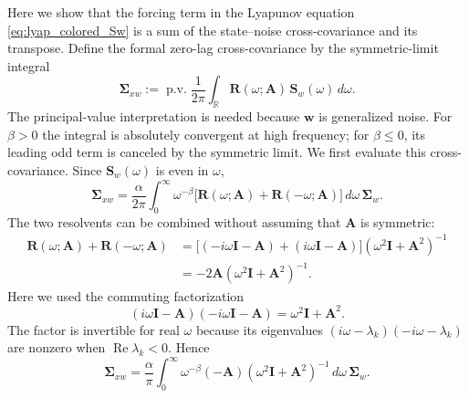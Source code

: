 \documentclass[12pt]{article}
\begin{document}
Here we show that the forcing term in the Lyapunov equation \eqref{eq:lyap_colored_Sw} is a sum of the state--noise cross-covariance and its transpose. Define the formal zero-lag cross-covariance by the symmetric-limit integral
\begin{equation}
    \boldsymbol{\Sigma}_{xw}
    :=\operatorname{p.v.}\frac{1}{2\pi}\int_{\mathbb R}
    \mathbf R(\omega;\mathbf A)\,\mathbf S_w(\omega)\,d\omega .
    \label{eq:Sigma_xw_definition}
\end{equation}
The principal-value interpretation is needed because $\boldsymbol w$ is generalized noise. For $\beta>0$ the integral is absolutely convergent at high frequency; for $\beta\le0$, its leading odd term is canceled by the symmetric limit. We first evaluate this cross-covariance. Since $\mathbf S_w(\omega)$ is even in $\omega$,
\begin{equation}
\boldsymbol{\Sigma}_{xw}
=\frac{\alpha}{2\pi}\int_{0}^{\infty}\omega^{-\beta}
\bigl[\mathbf R(\omega;\mathbf A)+\mathbf R(-\omega;\mathbf A)\bigr]\,d\omega\,
\boldsymbol{\Sigma}_w .
\label{eq:Sigma_xw_even}
\end{equation}
The two resolvents can be combined without assuming that $\mathbf A$ is symmetric:
\begin{equation}
\begin{aligned}
\mathbf R(\omega;\mathbf A)+\mathbf R(-\omega;\mathbf A)
&=\bigl[(-i\omega\mathbf I-\mathbf A)+(i\omega\mathbf I-\mathbf A)\bigr]
  (\omega^2\mathbf I+\mathbf A^2)^{-1}\\
&=-2\mathbf A(\omega^2\mathbf I+\mathbf A^2)^{-1}.
\end{aligned}
\label{eq:resolvent_pair_sum}
\end{equation}
Here we used the commuting factorization
\begin{equation}
(i\omega\mathbf I-\mathbf A)(-i\omega\mathbf I-\mathbf A)
=\omega^2\mathbf I+\mathbf A^2 .
\label{eq:resolvent_product}
\end{equation}
The factor is invertible for real $\omega$ because its eigenvalues
$(i\omega-\lambda_k)(-i\omega-\lambda_k)$ are nonzero when
$\operatorname{Re}\lambda_k<0$. Hence
\begin{equation}
\boldsymbol{\Sigma}_{xw}
=\frac{\alpha}{\pi}\int_{0}^{\infty}\omega^{-\beta}
(-\mathbf A)(\omega^2\mathbf I+\mathbf A^2)^{-1}\,d\omega\,
\boldsymbol{\Sigma}_w .
\label{eq:Sigma_xw_reduced}
\end{equation}
\end{document}
